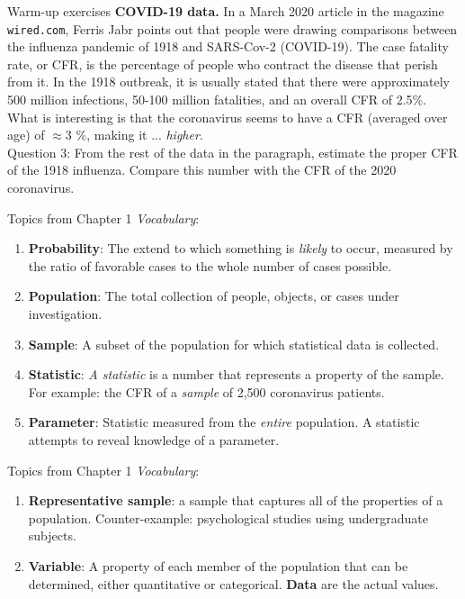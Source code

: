 \documentclass{beamer}
\begin{document}
\begin{frame}{Warm-up exercises}
\small
\textbf{COVID-19 data.}  In a March 2020 article in the magazine \texttt{wired.com}, Ferris Jabr points out that people were drawing comparisons between the influenza pandemic of 1918 and SARS-Cov-2 (COVID-19).  The \alert{case fatality rate}, or CFR, is the percentage of people who contract the disease that perish from it.  In the 1918 outbreak, it is usually stated that there were approximately 500 million infections, 50-100 million fatalities, and an overall CFR of 2.5\%.  What is interesting is that the coronavirus seems to have a CFR (averaged over age) of $\approx 3$ \%, making it ... \textit{higher}. \\ \vspace{0.5 cm}
Question 3: From the rest of the data in the paragraph, estimate the proper CFR of the 1918 influenza.  Compare this number with the CFR of the 2020 coronavirus.
\end{frame}

\begin{frame}{Topics from Chapter 1}
\small
\textit{Vocabulary}:
\begin{enumerate}
\item \textbf{Probability}: The extend to which something is \textit{likely} to occur, measured by the ratio of favorable cases to the whole number of cases possible.
\item \textbf{Population}: The total collection of people, objects, or cases under investigation.
\item \textbf{Sample}: A subset of the population for which statistical data is collected.
\item \textbf{Statistic}: \textit{A statistic} is a number that represents a property of the sample.  For example: the CFR of a \textit{sample} of 2,500 coronavirus patients.
\item \textbf{Parameter}: Statistic measured from the \textit{entire} population.  A statistic attempts to reveal knowledge of a parameter.
\end{enumerate}
\end{frame}

\begin{frame}{Topics from Chapter 1}
\small
\textit{Vocabulary}:
\begin{enumerate}
\item \textbf{Representative sample}: a sample that captures all of the properties of a population. Counter-example: psychological studies using undergraduate subjects.
\item \textbf{Variable}: A property of each member of the population that can be determined, either quantitative or categorical. \textbf{Data} are the actual values.
\end{enumerate}
\end{frame}
\end{document}
